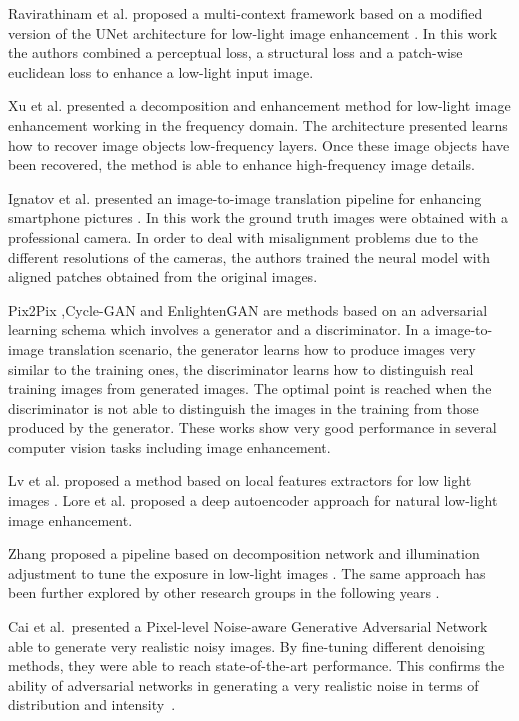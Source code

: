 \documentclass[3p,twocolumn]{elsarticle}
\begin{document}
Ravirathinam et al. proposed a multi-context framework based on a modified version of the UNet architecture for low-light image enhancement \cite{ravirathinam2021c}. In this work the authors combined a perceptual loss, a structural loss and a patch-wise euclidean loss to enhance a low-light input image.

Xu et al. presented a decomposition and enhancement method for low-light image enhancement working in the frequency domain. The architecture presented learns how to recover image objects low-frequency layers. Once these image objects have been recovered, the method is able to enhance high-frequency image details.

Ignatov et al. presented an image-to-image translation pipeline for enhancing smartphone pictures \cite{ignatov2017dslr}. In this work the ground truth images were obtained with a professional camera. In order to deal with misalignment problems due to the different resolutions of the cameras, the authors trained the neural model with aligned patches obtained from the original images.

Pix2Pix \cite{isola2017image},Cycle-GAN\cite{zhu2017unpaired} and EnlightenGAN \cite{jiang2021enlightengan} are methods based on an adversarial learning schema which involves a generator and a discriminator. In a image-to-image translation scenario, the generator learns how to produce images very similar to the training ones, the discriminator learns how to distinguish real training images from generated images. The optimal point is reached when the discriminator is not able to distinguish the images in the training from those produced by the generator. These works show very good performance in several computer vision tasks including image enhancement.

Lv et al. proposed a method based on local features extractors for low light images \cite{lv2018mbllen}. Lore et al. proposed a deep autoencoder approach for natural low-light image enhancement.\cite{lore2017llnet}


Zhang proposed a pipeline based on decomposition network and illumination adjustment to tune the exposure in low-light images \cite{zhang2019kindling}. The same approach has been further explored by other research groups in the following years \cite{lv2021low,zhu2020zero}.



Cai et al.\ presented a Pixel-level Noise-aware Generative Adversarial Network able to generate very realistic noisy images.  By fine-tuning different denoising methods, they were able to reach state-of-the-art performance. This confirms the ability of adversarial networks in generating a very realistic noise in terms of distribution and intensity~\cite{cai2021learning}.
\end{document}
